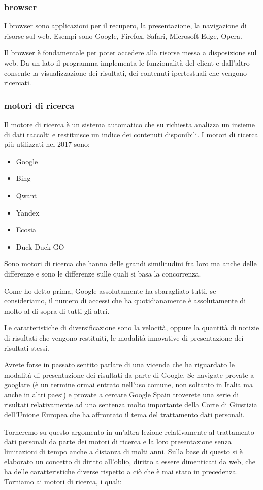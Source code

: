 \subsubsection{browser}
I browser sono applicazioni per il recupero, la presentazione, la navigazione di risorse sul web. Esempi sono  Google, Firefox, Safari, Microsoft Edge, Opera.\par
Il browser è fondamentale per poter accedere alla risorse messa a disposizione sul web. Da un lato il programma implementa le funzionalità del client e dall'altro consente la visualizzazione dei risultati, dei contenuti ipertestuali che vengono ricercati.\par

\subsubsection{motori di ricerca}
Il motore di ricerca è un sistema automatico che su richiesta analizza un insieme di dati raccolti e restituisce un indice dei contenuti disponibili. I motori di ricerca più utilizzati nel 2017 sono:

\begin{itemize}
    \item Google
    \item Bing
    \item Qwant
    \item Yandex
    \item Ecosia
    \item Duck Duck GO
\end{itemize}

Sono motori di ricerca che hanno delle grandi similitudini fra loro ma anche delle differenze e sono le differenze sulle quali si basa la concorrenza. \par
Come ho detto prima, Google assolutamente ha sbaragliato tutti, se consideriamo, il numero di accessi che ha quotidianamente è assolutamente di molto al di sopra di tutti gli altri.\par
Le caratteristiche di diversificazione sono la velocità, oppure la quantità di notizie di risultati che vengono restituiti, le modalità innovative di presentazione dei risultati stessi.\par
Avrete forse in passato sentito parlare di una vicenda che ha riguardato le modalità di presentazione dei risultati da parte di Google. Se navigate provate a googlare (è un termine ormai entrato nell'uso comune, non soltanto in Italia ma anche in altri paesi) e provate a cercare Google Spain troverete una serie di risultati relativamente ad una sentenza molto importante della Corte di Giustizia dell'Unione Europea che ha affrontato il tema del trattamento dati personali.\par
Torneremo su questo argomento in un'altra lezione relativamente al trattamento dati personali da parte dei motori di ricerca e la loro presentazione senza limitazioni di tempo anche a distanza di molti anni. Sulla base di questo si è elaborato un concetto di diritto all'oblio, diritto a essere dimenticati da web, che ha delle caratteristiche diverse rispetto a ciò che è mai stato in precedenza.
Torniamo ai motori di ricerca, i quali:

